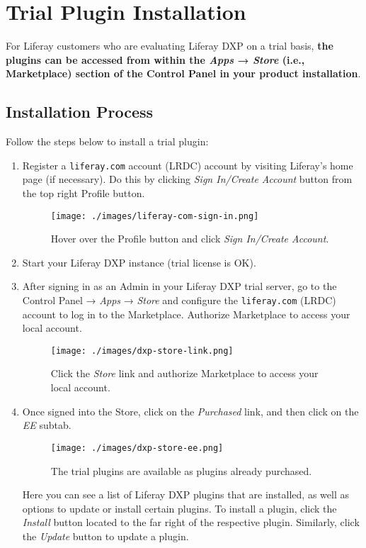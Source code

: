 \section{Trial Plugin Installation}\label{trial-plugin-installation}

For Liferay customers who are evaluating Liferay DXP on a trial basis,
\textbf{the plugins can be accessed from within the \emph{Apps} →
\emph{Store} (i.e., Marketplace) section of the Control Panel in your
product installation}.

\subsection{Installation Process}\label{installation-process}

Follow the steps below to install a trial plugin:

\begin{enumerate}
\def\labelenumi{\arabic{enumi}.}
\item
  Register a \texttt{liferay.com} account (LRDC) account by visiting
  Liferay's home page (if necessary). Do this by clicking \emph{Sign
  In/Create Account} button from the top right Profile button.

  \begin{figure}
  \centering
  \texttt{[image: ./images/liferay-com-sign-in.png]}
  \caption{Hover over the Profile button and click \emph{Sign In/Create
  Account}.}
  \end{figure}
\item
  Start your Liferay DXP instance (trial license is OK).
\item
  After signing in as an Admin in your Liferay DXP trial server, go to
  the Control Panel → \emph{Apps} → \emph{Store} and configure the
  \texttt{liferay.com} (LRDC) account to log in to the Marketplace.
  Authorize Marketplace to access your local account.

  \begin{figure}
  \centering
  \texttt{[image: ./images/dxp-store-link.png]}
  \caption{Click the \emph{Store} link and authorize Marketplace to
  access your local account.}
  \end{figure}
\item
  Once signed into the Store, click on the \emph{Purchased} link, and
  then click on the \emph{EE} subtab.

  \begin{figure}
  \centering
  \texttt{[image: ./images/dxp-store-ee.png]}
  \caption{The trial plugins are available as plugins already
  purchased.}
  \end{figure}

  Here you can see a list of Liferay DXP plugins that are installed, as
  well as options to update or install certain plugins. To install a
  plugin, click the \emph{Install} button located to the far right of
  the respective plugin. Similarly, click the \emph{Update} button to
  update a plugin.
\end{enumerate}

